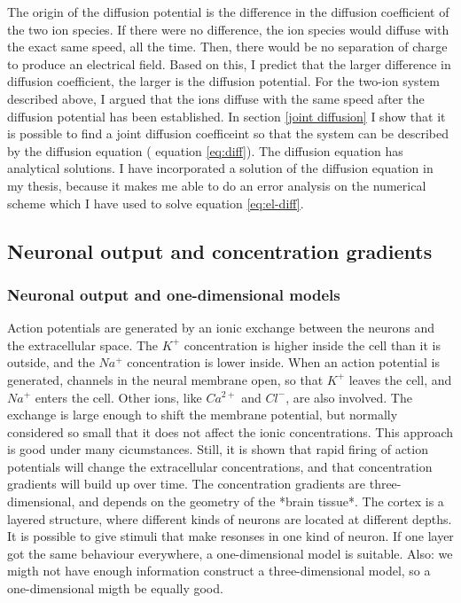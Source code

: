 \documentclass{article}
\begin{document}
The origin of the diffusion potential is the difference in the diffusion coefficient of the two ion species. If there were no difference, the ion species would diffuse with the exact same speed, all the time. Then, there would be no separation of charge to produce an electrical field. Based on this, I predict that the larger difference in diffusion coefficient, the larger is the diffusion potential. For the two-ion system described above, I argued that the ions diffuse with the same speed after the diffusion potential has been established. In section \ref{joint diffusion} I show that  it is possible to find a joint diffusion coefficeint so that the system can be described by the diffusion equation ( equation  \ref{eq:diff}). The diffusion equation has analytical solutions. I have incorporated a solution of the diffusion equation in my thesis, because it makes me able to do an error analysis on the numerical scheme which I have used to solve   equation \ref{eq:el-diff}.



 


\subsection{Neuronal output and concentration gradients}
\subsubsection{Neuronal output and one-dimensional models}
Action potentials are generated by an ionic exchange between the neurons and the extracellular space. The $K^+$ concentration is higher inside the cell than it is outside, and the $Na^+$ concentration is lower inside. When an action potential is generated,  channels in the neural membrane open, so that $K^+$ leaves the cell, and $Na^+$ enters the cell. Other ions, like $Ca^{2+}$ and $Cl^-$, are also involved. The exchange is large enough to shift the membrane potential, but normally considered so small that it does not affect the ionic concentrations. This approach is good under many cicumstances. Still, it is shown that rapid firing of action potentials will change the extracellular concentrations, and that concentration gradients will build up over time. The concentration gradients are three-dimensional, and depends on the geometry of the *brain tissue*.  The cortex is a layered structure, where different kinds of neurons are located at different depths. It is possible to give stimuli that make resonses in one kind of neuron. If one layer got the same behaviour everywhere, a one-dimensional model is suitable. Also: we migth not have enough information construct a three-dimensional model, so a one-dimensional migth be equally good. 
\end{document}
